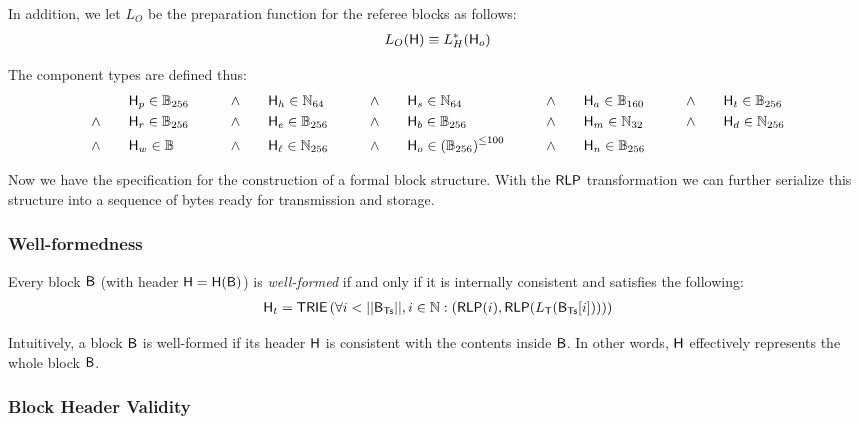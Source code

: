 In addition, we let $L_O$ be the preparation function for the referee blocks as follows:
\begin{align*}
	L_O(\textsf{H})\equiv L_H^*(\textsf{H}_o)
\end{align*}

The component types are defined thus: 
\begin{align}
	& \head_p \in \B_{256} 
	\qquad &\land \qquad &\head_h\in \N_{64}
	\qquad &\land \qquad &\head_s\in \N_{64}
	\qquad &\land \qquad &\head_a\in \B_{160}
	\qquad &\land \qquad &\head_t\in \B_{256}
	\notag\\
	\land \qquad &\head_r\in \B_{256}
	\qquad & \land \qquad &\head_e\in \B_{256}
	\qquad &\land \qquad &\head_b\in \B_{256} 
	\qquad &\land \qquad &\head_m\in \N_{32}	
	\qquad &\land \qquad &\head_d\in \N_{256}	
	\notag\\
	\land \qquad &\head_w\in \B
	\qquad &\land \qquad &\head_\ell\in \N_{256}	%
	\qquad &\land \qquad &\head_{o} \in\left(\B_{256}\right)^{\le \numberofommers}
	\qquad &\land \qquad &\head_n\in \B_{256}
\end{align}

Now we have the specification for the construction of a formal block structure. 
With the $\mathsf{RLP}$ transformation we can further serialize this structure into a sequence of bytes ready for transmission and storage. 
 

  
\subsubsection{Well-formedness}
\label{sec:internal consistency}
Every {\name} block $\textsf{B}$ (with header $\textsf{H}=\textsf{H}(\textsf{B})$) is \emph{well-formed} if and only if it is internally consistent and satisfies the following: 
\begin{align}
	\head_t = \trie\left(\forall i<||\block_{\txs}||, i\in \N: \left(\rlp(i),\rlp(L_{\tx}(\block_{\txs}[i]))\right) \right)  
\end{align}

Intuitively, a block $\textsf{B}$ is well-formed if its header $\textsf{H}$ is consistent with the contents inside $\textsf{B}$.
In other words, $\textsf{H}$ effectively represents the whole block $\textsf{B}$.




\subsubsection{Block Header Validity}
\label{sec:valid header}

